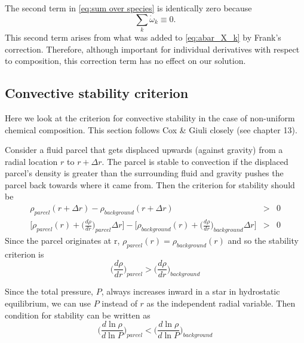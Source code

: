 The second term in \eqref{eq:sum over species} is identically zero because
\[
\sum_k \dot{\omega}_k \equiv 0.
\]
This second term arises from what was added to \eqref{eq:abar_X_k} by 
Frank's correction.  Therefore, although important for individual derivatives
with respect to composition, this correction term has no effect on our 
solution.

\subsection{Convective stability criterion}

Here we look at the criterion for convective stability in the case of 
non-uniform chemical composition.  This section follows Cox \& Giuli 
\cite{cg-ed2} closely (see chapter 13).  

Consider a fluid parcel that gets displaced upwards (against gravity) from
a radial location $r$ to $r + \Delta r$.  
The parcel is stable to convection if the displaced parcel's density is 
greater than 
the surrounding fluid and gravity pushes the parcel back towards where it came
from.  Then the criterion for stability should be
\begin{eqnarray}
 \rho_{parcel}(r+\Delta r) - \rho_{background}(r + \Delta r) &>& 0 \\
 \bigg[\rho_{parcel}(r) + \bigg(\frac{d\rho}{dr}\bigg)_{parcel}\Delta r\bigg] - 
 \bigg[\rho_{background}(r) + \bigg(\frac{d\rho}{dr}\bigg)_{background}\Delta r\bigg] &>& 0 
\end{eqnarray}
Since the parcel originates at r, $\rho_{parcel}(r) = \rho_{background}(r)$ and
so the stability criterion is
\begin{equation}
 \bigg(\frac{d\rho}{dr}\bigg)_{parcel} > \bigg(\frac{d\rho}{dr}\bigg)_{background}
\label{eqn:basicStability}
\end{equation}

Since the total pressure, $P$, always increases inward in a star in hydrostatic
equilibrium, we can use $P$ instead of $r$ as the independent radial variable.  
Then condition for stability can be written as
\[
 \bigg( \frac{d \ln \rho}{d \ln P}\bigg )_{parcel} < \bigg(\frac{d \ln \rho}{d \ln P}\bigg)_{background}
\]

